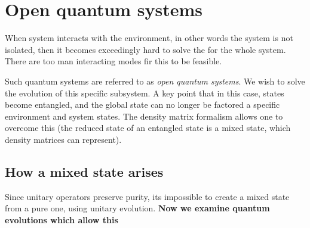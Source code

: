 \section{Open quantum systems\label{sec:textbook_open_quantum_systems}}
When system interacts  with the environment, in other  words the system
is  not  isolated,  then  it  becomes exceedingly  hard  to  solve  the
\schrodinger for the whole system.  There are too man interacting modes
fir this to be feasible.

Such  quantum   systems  are   referred  to  as   \textit{open  quantum
  systems}.  We   wish  to  solve   the  evolution  of   this  specific
subsystem. A key point that in  this case, states become entangled, and
the global state  can no longer be factored a  specific environment and
system states. The density matrix formalism allows one to overcome this
(the  reduced state  of  an entangled  state is  a  mixed state,  which
density matrices can represent).

\subsection{How a mixed state arises}
Since unitary  operators preserve  purity, its  impossible to  create a
mixed state  from a pure  one, using unitary evolution.  \textbf{Now we
  examine quantum evolutions which allow this}

